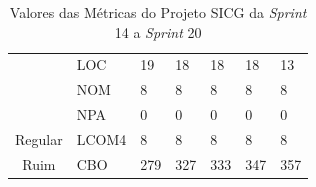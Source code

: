 \begin{table}[H]
\begin{tabular}{|c|l|l|l|l|l|l|}
                                                   & LOC              & 19                 & 18                 & 18                 & 18                 & 13                 \\ \cline{2-7} 
                                                   & NOM              & 8                  & 8                  & 8                  & 8                  & 8                  \\ \cline{2-7} 
                                                   & NPA              & 0                  & 0                  & 0                  & 0                  & 0                  \\ \hline
Regular                                            & LCOM4            & 8                  & 8                  & 8                  & 8                  & 8                  \\ \hline
Ruim                                               & CBO              & 279                & 327                & 333                & 347                & 357                \\ \hline
\end{tabular}
\caption{Valores das Métricas do Projeto SICG da \textit{Sprint} 14 a \textit{Sprint} 20}
		\label{metricasprint3}
\end{table}

